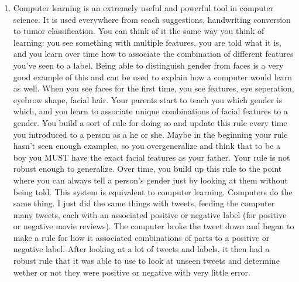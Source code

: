 \documentclass[12pt,twoside]{article}
\begin{document}
\begin{problems}
\begin{enumerate}
\problem \item Computer learning is an extremely useful and powerful tool in computer science.  It is used everywhere from seach suggestions, handwriting conversion to tumor classification.  You can think of it the same way you think of learning: you see something with multiple features, you are told what it is, and you learn over time how to associate the combination of different features you've seen to a label. Being able to distinguish gender from faces is a very good example of this and can be used to explain how a computer would learn as well.  When you see faces for the first time, you see features, eye seperation, eyebrow shape, facial hair.  Your parents start to teach you which gender is which, and you learn to associate unique combinations of facial features to a gender.  You build a sort of rule for doing so and update this rule every time you introduced to a person as a he or she.  Maybe in the beginning your rule hasn't seen enough examples, so you overgeneralize and think that to be a boy you MUST have the exact facial features as your father.  Your rule is not robust enough to generalize.  Over time, you build up this rule to the point where you can always tell a person's gender just by looking at them without being told. This system is equivalent to computer learning.  Computers do the same thing. I just did the same things with tweets, feeding the computer many tweets, each with an associated positive or negative label (for positive or negative movie reviews).  The computer broke the tweet down and began to make a rule for how it associated combinations of parts to a positive or negative label.  After looking at a lot of tweets and labels, it then had a robust rule that it was able to use to look at unseen tweets and determine wether or not they were positive or negative with very little error. \newline


\end{enumerate}
\end{problems}
\end{document}
